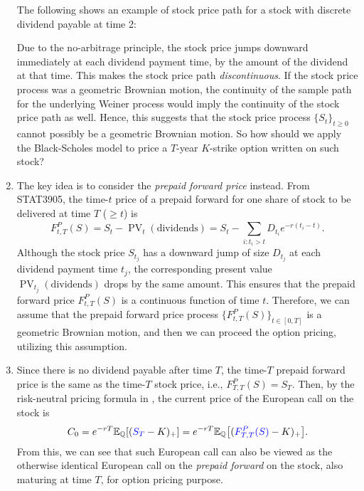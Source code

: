 \begin{enumerate}
The following shows an example of stock price path for a stock with discrete
dividend payable at time 2:
\begin{center}
\end{center}
Due to the no-arbitrage principle, the stock price jumps downward immediately
at each dividend payment time, by the amount of the dividend at that time. This
makes the stock price path \emph{discontinuous}. If the stock price process was
a geometric Brownian motion, the continuity of the sample path for the
underlying Weiner process would imply the continuity of the stock price path as
well. Hence, this suggests that the stock price process \(\{S_t\}_{t\ge 0}\)
cannot possibly be a geometric Brownian motion. So how should we apply the
Black-Scholes model to price a \(T\)-year \(K\)-strike option written on such
stock?

\item The key idea is to consider the \emph{prepaid forward price} instead.
From STAT3905, the time-\(t\) price of a prepaid forward for one share of stock to be
delivered at time \(T\) (\(\ge t\)) is
\[
F_{t,T}^{P}(S)=S_t-\operatorname{PV}_{t}(\text{dividends})
=S_t-\sum_{i:t_i>t}^{}D_{t_i}e^{-r(t_i-t)}.
\]
Although the stock price \(S_{t_j}\) has a downward jump of size \(D_{t_j}\) at each dividend
payment time \(t_j\), the corresponding present value
\(\operatorname{PV}_{t_j}(\text{dividends})\) drops by the same amount. This
ensures that the prepaid forward price \(F_{t,T}^{P}(S)\) is a continuous
function of time \(t\). Therefore, we can assume that the prepaid forward price
process \(\{F_{t,T}^{P}(S)\}_{t\in[0,T]}\) is a geometric Brownian motion, and
then we can proceed the option pricing, utilizing this assumption.

\item Since there is no dividend payable after time \(T\), the time-\(T\)
prepaid forward price is the same as the time-\(T\) stock price, i.e.,
\(F_{T,T}^{P}(S)=S_T\). Then, by the risk-neutral pricing formula in
, the current price of the European call on
the stock is
\[
C_0=e^{-rT}\mathbb{E}_{\mathbb{Q}}\qty[({\color{blue}S_T}-K)_{+}]
=e^{-rT}\mathbb{E}_{\mathbb{Q}}\qty[({\color{blue}F_{T,T}^{P}(S)}-K)_{+}].
\]
From this, we can see that such European call can also be viewed as the
otherwise identical European call on the \emph{prepaid forward} on the stock,
also maturing at time \(T\), for option pricing purpose.


\end{enumerate}
